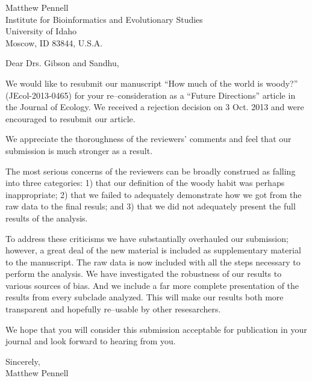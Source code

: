 \documentclass[a4paper,12pt]{article}
\begin{document}
{\raggedleft
  Matthew Pennell\\
  Institute for Bioinformatics and Evolutionary Studies\\
  University of Idaho\\
 Moscow, ID 83844, U.S.A.\\[2ex]
}

\vspace{3ex}

Dear Drs. Gibson and Sandhu,

We would like to resubmit our manuscript ``How much of the world is woody?'' (JEcol-2013-0465) 
for your re--consideration as a ``Future Directions'' article in the Journal of Ecology.
We received a rejection decision on 3 Oct. 2013 and were encouraged to resubmit our article.

We appreciate the thoroughness of the reviewers' comments and feel that our submission is much 
stronger as a result.

The most serious concerns of the reviewers can be broadly construed as falling into three categories:
1) that our definition of the woody habit was perhaps inappropriate; 2) that we failed to adequately
demonstrate how we got from the raw data to the final resuls; and 3) that we did not adequately 
present the full results of the analysis.

To address these criticisms we have substantially overhauled our submission; however, a great 
deal of the new material is included as supplementary material to the manuscript. The raw data is now
included with all the steps necessary to perform the analysis. We have investigated the robustness of 
our results to various sources of bias. And we include a far more complete presentation of the results
from every subclade analyzed. This will make our results both more transparent and hopefully re--usable
by other resesarchers.

We hope that you will consider this submission acceptable for publication in your journal and 
look forward to hearing from you.


\begin{flushright}
\vspace{2ex}
\hspace{.2\textwidth}Sincerely,\\
\hspace*{.3\textwidth}
Matthew Pennell
\end{flushright}
\end{document}
